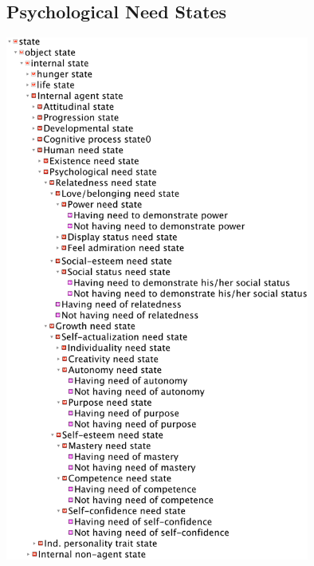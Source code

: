 \subsection{Psychological Need States}
\includegraphics[width=0.75\textwidth]{images/appendix/tree-overview-need-states.png} \newpage

\newpage
